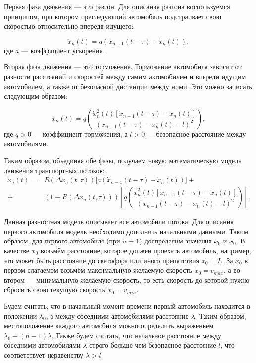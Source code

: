 \documentclass[12pt, a4paper]{extarticle}
\numberwithin{equation}{section}
\numberwithin{figure}{section}
\begin{document}
Первая фаза движения --- это разгон. Для описания разгона воспользуемся принципом, при котором преследующий автомобиль подстраивает свою скоростью относительно впереди идущего:

\begin{equation*}
\ddot{x}_n(t)= a(\dot{x}_{n-1}(t-\tau)-\dot{x}_n(t)),
\end{equation*}
где $a$ --- коэффициент ускорения.

Вторая фаза движения --- это торможение. Торможение автомобиля зависит от разности расстояний и скоростей между самим автомобилем и впереди идущим автомобилем, а также от безопасной дистанции между ними. Это можно записать следующим образом: 

\begin{equation*}
\ddot{x}_n(t)= q\left(  \dfrac{\dot{x}_n^2(t)\left[  \dot{x}_{n-1}(t-\tau) - \dot{x}_n(t) \right]}{(x_{n-1}(t-\tau)-x_n(t)-l)^2}\right),
\end{equation*}
где $q > 0$ --- коэффициент торможения, а $l > 0$ --- безопасное расстояние между автомобилями.

Таким образом, объединяя обе фазы, получаем новую математическую модель движения транспортных потоков:
\begin{equation} \label{my_model} 
\begin{split}
\ddot{x}_n(t)= &R(\Delta x_n(t,\tau))\bigg[ a(\dot{x}_{n-1}(t-\tau)-\dot{x}_n(t))\bigg]  +\\+& (1-R(\Delta x_n(t,\tau)))\left[  q\left(  \dfrac{\dot{x}_n^2(t)\left[  \dot{x}_{n-1}(t-\tau) - \dot{x}_n(t) \right]}{(x_{n-1}(t-\tau)-x_n(t)-l)^2}\right) \right]. 
\end{split}
\end{equation}

Данная разностная модель описывает все автомобили потока. Для описания первого автомобиля модель необходимо дополнить начальными данными. Таким образом, для первого автомобиля (при $n=1$) доопределим значения $x_{0}$ и $\dot{x}_{0}$. В качестве $x_{0}$ возьмём расстояние, которое должен проехать автомобиль, например, это может быть расстояние до светофора или иного препятствия $x_{0}=L$. За $\dot{x}_{0}$ в первом слагаемом возьмём максимальную желаемую скорость $\dot{x}_{0}=v_{max}$, а во втором --- минимальную желаемую скорость, то есть скорость до которой нужно сбросить свою текущую скорость $\dot{x}_{0}=v_{min}$.

Будем считать, что в начальный момент времени первый автомобиль находится в положении $\lambda_0$, а между соседними автомобилями расстояние $\lambda$. Таким образом, местоположение каждого автомобиля можно определить выражением $\lambda_0-(n-1)\lambda$. Также будем считать, что начальное расстояние между соседними автомобилями $\lambda$ строго больше чем безопасное расстояние $l$, что соответствует неравенству $\lambda > l$.
\end{document}
